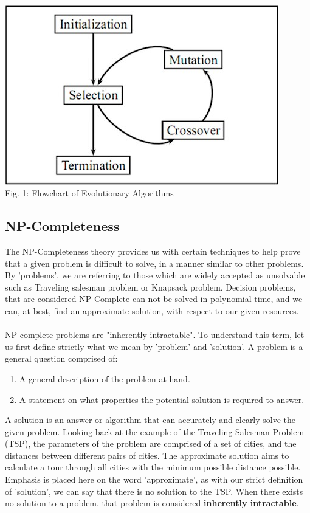 \documentclass[conference,compsoc]{IEEEtran}
\begin{document}
\paragraph{}
\begin{center}
\includegraphics[scale=0.4]{Report/EAflow.png}\\
    Fig. 1: Flowchart of Evolutionary Algorithms
\end{center}

\subsection{NP-Completeness}
The NP-Completeness theory provides us with certain techniques to help prove that a given problem is difficult to solve, 
in a manner similar to other problems. By 'problems', we are referring to those which are widely accepted as unsolvable 
such as Traveling salesman problem or Knapsack problem. Decision problems, that are considered NP-Complete can 
not be solved in polynomial time, and we can, at best, find an approximate solution, with respect to our given resources.
\\
\\
NP-complete problems are "inherently intractable". To understand this term, let us first define 
strictly what we mean by 'problem' and 'solution'. A problem is a general question comprised of:
\begin{enumerate}
    \item A general description of the problem at hand.
    \item A statement on what properties the potential solution is required to answer. \cite{garey_johnson_2003}
\end{enumerate}
A solution is an answer or algorithm that can accurately and clearly solve the given problem. 
Looking back at the example of the Traveling Salesman Problem (TSP), the parameters of the problem are 
comprised of a set of cities, and the distances between different pairs of cities. The approximate solution 
aims to calculate a tour through all cities with the minimum possible distance possible. Emphasis is placed 
here on the word 'approximate', as with our strict definition of 'solution', we can say that there is no solution 
to the TSP. When there exists no solution to a problem, that problem is considered \textbf{inherently intractable}.
\end{document}
